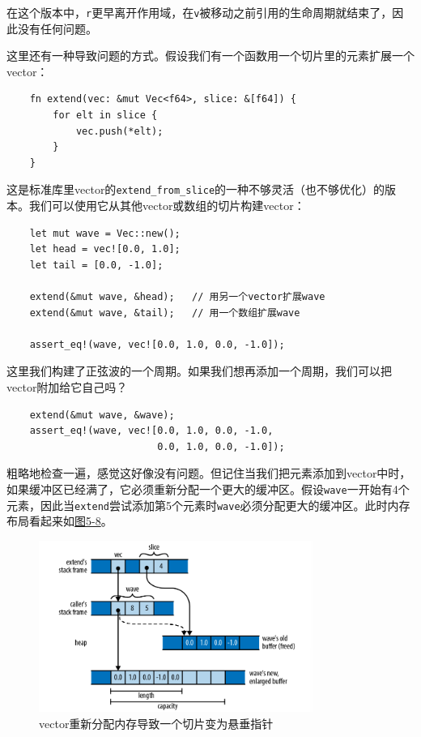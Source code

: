 在这个版本中，\texttt{r}更早离开作用域，在\texttt{v}被移动之前引用的生命周期就结束了，因此没有任何问题。

这里还有一种导致问题的方式。假设我们有一个函数用一个切片里的元素扩展一个vector：
\begin{verbatim}
    fn extend(vec: &mut Vec<f64>, slice: &[f64]) {
        for elt in slice {
            vec.push(*elt);
        }
    }
\end{verbatim}

这是标准库里vector的\texttt{extend\_from\_slice}的一种不够灵活（也不够优化）的版本。我们可以使用它从其他vector或数组的切片构建vector：
\begin{verbatim}
    let mut wave = Vec::new();
    let head = vec![0.0, 1.0];
    let tail = [0.0, -1.0];

    extend(&mut wave, &head);   // 用另一个vector扩展wave
    extend(&mut wave, &tail);   // 用一个数组扩展wave

    assert_eq!(wave, vec![0.0, 1.0, 0.0, -1.0]);
\end{verbatim}

这里我们构建了正弦波的一个周期。如果我们想再添加一个周期，我们可以把vector附加给它自己吗？
\begin{verbatim}
    extend(&mut wave, &wave);
    assert_eq!(wave, vec![0.0, 1.0, 0.0, -1.0,
                          0.0, 1.0, 0.0, -1.0]);
\end{verbatim}

粗略地检查一遍，感觉这好像没有问题。但记住当我们把元素添加到vector中时，如果缓冲区已经满了，它必须重新分配一个更大的缓冲区。假设\texttt{wave}一开始有4个元素，因此当\texttt{extend}尝试添加第5个元素时\texttt{wave}必须分配更大的缓冲区。此时内存布局看起来如\hyperref[f5-8]{图5-8}。

\begin{figure}[htbp]
    \centering
    \includegraphics[width=0.8\textwidth]{../img/f5-8.png}
    \caption{vector重新分配内存导致一个切片变为悬垂指针}
    \label{f5-8}
\end{figure}

